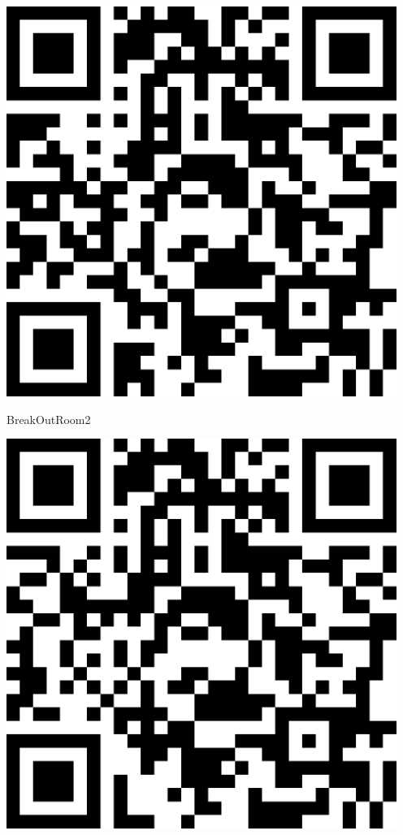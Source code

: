 \documentclass[letterpaper]{article}
\begin{document}
 
 \vspace*{\fill} 
 \begingroup 
 \centerline{\includegraphics[scale=1,width=5in,height=5in]{BreakOutRoom2.png}} 
 \endgroup 
 \vspace*{\fill} 

 \hfill{\small BreakOutRoom2} 

 \vspace{1in} 
 \pagebreak 
{} 
 \vspace*{\fill} 
 \begingroup 
 \centerline{\includegraphics[scale=1,width=5in,height=5in]{BreakOutRoom3.png}} 
 \endgroup 
 \vspace*{\fill} 
\end{document}
